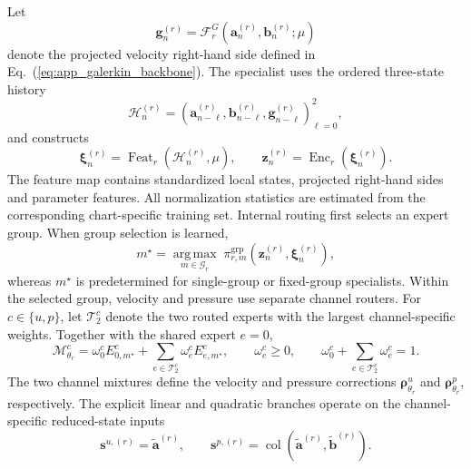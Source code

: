 \documentclass{article}
\def\plaineqref#1{\ref{#1}}
\begin{document}
Let
\begin{equation}
  \bm g_n^{(r)}
  =
  \mathcal F_r^G
  \left(
    \bm a_n^{(r)},\bm b_n^{(r)};\mu
  \right)
  \label{eq:app_galerkin_feature}
\end{equation}
denote the projected velocity right-hand side defined in Eq.~(\plaineqref{eq:app_galerkin_backbone}). The specialist uses the ordered three-state history
\begin{equation}
  \mathcal H_n^{(r)}
  =
  \left(
    \bm a_{n-\ell}^{(r)},
    \bm b_{n-\ell}^{(r)},
    \bm g_{n-\ell}^{(r)}
  \right)_{\ell=0}^{2},
  \label{eq:app_specialist_history}
\end{equation}
and constructs
\begin{equation}
  \bm\xi_n^{(r)}
  =
  \operatorname{Feat}_r
  \left(
    \mathcal H_n^{(r)},\mu
  \right),
  \qquad
  \bm z_n^{(r)}
  =
  \operatorname{Enc}_r
  \left(
    \bm\xi_n^{(r)}
  \right).
  \label{eq:app_specialist_features}
\end{equation}
The feature map contains standardized local states, projected
right-hand sides and parameter features. All normalization statistics are estimated from the corresponding chart-specific training set. Internal routing first selects an expert group. When group selection is learned,
\begin{equation}
  m^\star
  =
  \underset{m\in\mathcal G_r}{\operatorname{arg\,max}}
  \;
  \pi_{r,m}^{\mathrm{grp}}
  \left(
    \bm z_n^{(r)},\bm\xi_n^{(r)}
  \right),
  \label{eq:app_group_top1}
\end{equation}
whereas $m^\star$ is predetermined for single-group or fixed-group
specialists. Within the selected group, velocity and pressure use separate channel routers. For $c\in\{u,p\}$, let $\mathcal T_2^c$ denote the two routed experts with the largest channel-specific weights. Together with the shared expert $e=0$,
\begin{equation}
  \mathcal M_{\theta_r}^c
  =
  \omega_0^c
  E_{0,m^\star}^c
  +
  \sum_{e\in\mathcal T_2^c}
  \omega_e^c
  E_{e,m^\star}^c,
  \qquad
  \omega_e^c\ge0,
  \qquad
  \omega_0^c+\sum_{e\in\mathcal T_2^c}\omega_e^c=1.
  \label{eq:app_channel_sparse_moe}
\end{equation}
The two channel mixtures define the velocity and pressure corrections
$\bm\rho_{\theta_r}^u$ and $\bm\rho_{\theta_r}^p$, respectively. The explicit linear and quadratic branches operate on the channel-specific reduced-state inputs
\begin{equation}
  \bm s^{u,(r)}
  =
  \widetilde{\bm a}^{(r)},
  \qquad
  \bm s^{p,(r)}
  =
  \operatorname{col}
  \left(
    \widetilde{\bm a}^{(r)},
    \widetilde{\bm b}^{(r)}
  \right).
  \label{eq:app_expert_state_slices}
\end{equation}
\end{document}
